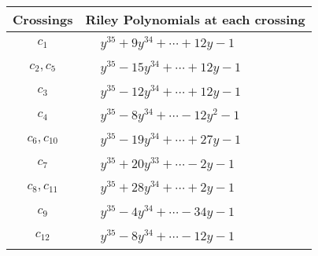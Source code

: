 \documentclass[1p]{elsarticle_modified}
\theoremstyle{definition}
\begin{document}
\begin{tabular}{m{50pt}|m{274pt}}
Crossings & \hspace{64pt}Riley Polynomials at each crossing \\
\hline $$\begin{aligned}c_{1}\end{aligned}$$&$\begin{aligned}
&y^{35}+9 y^{34}+\cdots+12 y-1
\end{aligned}$\\
\hline $$\begin{aligned}c_{2},c_{5}\end{aligned}$$&$\begin{aligned}
&y^{35}-15 y^{34}+\cdots+12 y-1
\end{aligned}$\\
\hline $$\begin{aligned}c_{3}\end{aligned}$$&$\begin{aligned}
&y^{35}-12 y^{34}+\cdots+12 y-1
\end{aligned}$\\
\hline $$\begin{aligned}c_{4}\end{aligned}$$&$\begin{aligned}
&y^{35}-8 y^{34}+\cdots-12 y^2-1
\end{aligned}$\\
\hline $$\begin{aligned}c_{6},c_{10}\end{aligned}$$&$\begin{aligned}
&y^{35}-19 y^{34}+\cdots+27 y-1
\end{aligned}$\\
\hline $$\begin{aligned}c_{7}\end{aligned}$$&$\begin{aligned}
&y^{35}+20 y^{33}+\cdots-2 y-1
\end{aligned}$\\
\hline $$\begin{aligned}c_{8},c_{11}\end{aligned}$$&$\begin{aligned}
&y^{35}+28 y^{34}+\cdots+2 y-1
\end{aligned}$\\
\hline $$\begin{aligned}c_{9}\end{aligned}$$&$\begin{aligned}
&y^{35}-4 y^{34}+\cdots-34 y-1
\end{aligned}$\\
\hline $$\begin{aligned}c_{12}\end{aligned}$$&$\begin{aligned}
&y^{35}-8 y^{34}+\cdots-12 y-1
\end{aligned}$\\
\hline
\end{tabular}\\~\\
\end{document}
